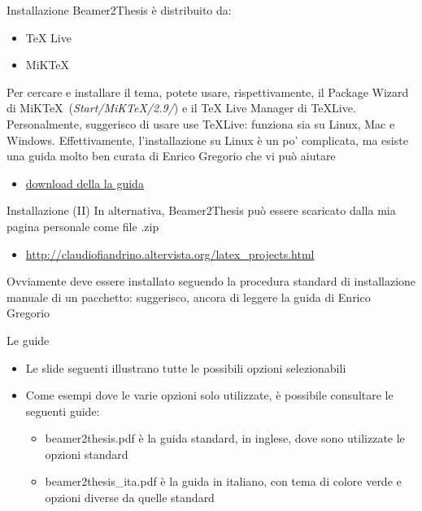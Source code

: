 \begin{tframe}{Installazione}
Beamer2Thesis è distribuito da:
\begin{itemize}
\item TeX Live
\item MiKTeX
\end{itemize}
Per cercare e installare il tema, potete usare, rispettivamente, il Package Wizard di MiK\TeX\, (\emph{Start/MiKTeX/2.9/}) e il TeX Live Manager di \TeX Live.
Personalmente, suggerisco di usare use \TeX Live: funziona sia su Linux, Mac e Windows. Effettivamente, l'installazione su Linux è un po' complicata, ma esiste una guida molto ben curata di Enrico Gregorio che vi può aiutare
\begin{itemize}
\item \href{http://profs.sci.univr.it/~gregorio/texlive-ubuntu.pdf}{download della la guida}
\end{itemize}
\label{slide-guide-installation}
\end{tframe}

\begin{tframe}{Installazione (II)}
In alternativa, Beamer2Thesis può essere scaricato dalla mia pagina personale come file .zip
\begin{itemize}
\item \href{http://claudiofiandrino.altervista.org/latex\_projects.html}{http://claudiofiandrino.altervista.org/latex\_projects.html}
\end{itemize}
Ovviamente deve essere installato seguendo la procedura standard di installazione manuale di un pacchetto: suggerisco, ancora di leggere la guida di Enrico Gregorio
\end{tframe}

\begin{tframe}{Le guide}
\begin{itemize}
\item Le slide seguenti illustrano tutte le possibili opzioni selezionabili
\item Come esempi dove le varie opzioni solo utilizzate, è possibile consultare le seguenti guide:
\begin{itemize}
\item beamer2thesis.pdf è la guida standard, in inglese, dove sono utilizzate le opzioni standard
\item beamer2thesis\_ita.pdf è la guida in italiano, con tema di colore verde e opzioni diverse da quelle standard
\end{itemize}
\end{itemize}
\end{tframe}

